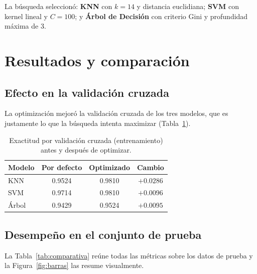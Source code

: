 \documentclass[11pt,letterpaper,twoside]{article}
\begin{document}
\begin{resultado}
La búsqueda seleccionó: \textbf{KNN} con $k=14$ y distancia euclidiana; \textbf{SVM} con kernel lineal y $C=100$; y \textbf{Árbol de Decisión} con criterio Gini y profundidad máxima de 3.
\end{resultado}

\section{Resultados y comparación}
\label{sec:resultados}

\subsection{Efecto en la validación cruzada}
La optimización mejoró la validación cruzada de los tres modelos, que es justamente lo que la búsqueda intenta maximizar (Tabla~\ref{tab:cv}).

\begin{table}[H]
\centering
\caption{Exactitud por validación cruzada (entrenamiento) antes y después de optimizar.}
\label{tab:cv}
\begin{tabular}{lccc}
\toprule
\textbf{Modelo} & \textbf{Por defecto} & \textbf{Optimizado} & \textbf{Cambio} \\
\midrule
KNN   & 0.9524 & 0.9810 & $+0.0286$ \\
SVM   & 0.9714 & 0.9810 & $+0.0096$ \\
Árbol & 0.9429 & 0.9524 & $+0.0095$ \\
\bottomrule
\end{tabular}
\end{table}

\subsection{Desempeño en el conjunto de prueba}
La Tabla~\ref{tab:comparativa} reúne todas las métricas sobre los datos de prueba y la Figura~\ref{fig:barras} las resume visualmente.
\end{document}
